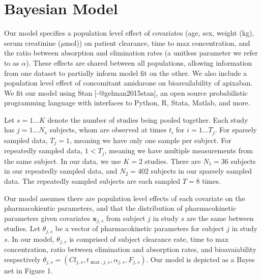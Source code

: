 \section{Bayesian Model}


Our model specifies a population level effect of covariates (age, sex, weight (kg), serum creatinine ($\mu \mbox{mol}$)) on patient clearance, time to max concentration, and the ratio between absorption and elimination rates (a unitless parameter we refer to as $\alpha$). These effects are shared between all populations, allowing information from one dataset to partially inform model fit on the other.  We also include a population level effect of concomitant amidarone on bioavailability of apixaban.  We fit our model using Stan [-@gelman2015stan], an open source probabilistic programming language with interfaces to Python, R, Stata, Matlab, and more.

Let $s = 1 \dots K$ denote the number of studies being pooled together.  Each study has $j = 1 \dots N_s$ subjects, whom are observed at times $t_i$ for $i = 1 \dots T_j$.  For sparsely sampled data, $T_j=1$, meaning we have only one sample per subject.  For repeatedly sampled data, $1<T_j$, meaning we have multiple measurements from the same subject.  In our data, we use $K=2$ studies.  There are $N_1=36$ subjects in our repeatedly sampled data, and $N_2=402$ subjects in our sparsely sampled data.  The repeatedly sampled subjects are each sampled $T=8$ times.

Our model assumes there are population level effects of each covariate on the pharmacokientic parameters, and that the distribution of pharmacokinetic parameters given covariates $\mathbf{x}_{j, s}$ from subject $j$ in study $s$ are the same between studies.  Let $\theta_{j, s}$ be a vector of pharmacokinetic parameters for subject $j$ in study $s$.  In our model, $\theta_{j, s}$ is comprised of subject clearance rate, time to max concentration, ratio between elimination and absorption rates, and bioavaiability respectively  $\theta_{j,s} = (Cl_{j, s}, t_{\max, j, s}, \alpha_{j, s}, F_{j, s})$.  Our model is depicted as a Bayes net in Figure 1.

